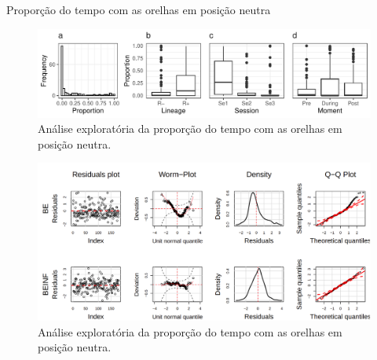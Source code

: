 \documentclass[
  ignorenonframetext,
  serif,
  professionalfont,
  usenames,
  dvipsnames,
  aspectratio = 169]{beamer}
\begin{document}
\begin{frame}{Proporção do tempo com as orelhas em posição neutra}
\protect\hypertarget{proporuxe7uxe3o-do-tempo-com-as-orelhas-em-posiuxe7uxe3o-neutra-1}{}
\begin{figure}

{\centering \includegraphics[width=0.95\linewidth]{./img/prop} 

}

\caption{Análise exploratória da proporção do tempo com as orelhas em posição neutra.}\label{fig:unnamed-chunk-12}
\end{figure}
\end{frame}

\begin{frame}{}
\protect\hypertarget{section-3}{}
\end{frame}

\begin{frame}{}
\protect\hypertarget{section-4}{}
\begin{figure}

{\centering \includegraphics[width=0.95\linewidth]{./img/mbetas} 

}

\caption{Análise exploratória da proporção do tempo com as orelhas em posição neutra.}\label{fig:unnamed-chunk-13}
\end{figure}
\end{frame}
\end{document}
